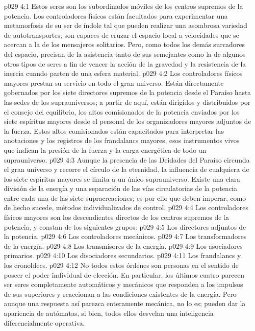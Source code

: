 \vs p029 4:1 Estos seres son los subordinados móviles de los centros supremos de la potencia. Los controladores físicos están facultados para experimentar una metamorfosis de su ser de índole tal que pueden realizar una asombrosa variedad de autotransportes; son capaces de cruzar el espacio local a velocidades que se acercan a la de los mensajeros solitarios. Pero, como todos los demás surcadores del espacio, precisan de la asistencia tanto de sus semejantes como la de algunos otros tipos de seres a fin de vencer la acción de la gravedad y la resistencia de la inercia cuando parten de una esfera material.
\vs p029 4:2 Los controladores físicos mayores prestan su servicio en todo el gran universo. Están directamente gobernados por los siete directores supremos de la potencia desde el Paraíso hasta las sedes de los suprauniversos; a partir de aquí, están dirigidos y distribuidos por el consejo del equilibrio, los altos comisionados de la potencia enviados por los siete espíritus mayores desde el personal de los organizadores mayores adjuntos de la fuerza. Estos altos comisionados están capacitados para interpretar las anotaciones y los registros de los frandalancs mayores, esos instrumentos vivos que indican la presión de la fuerza y la carga energética de todo un suprauniverso.
\vs p029 4:3 Aunque la presencia de las Deidades del Paraíso circunda el gran universo y recorre el círculo de la eternidad, la influencia de cualquiera de los siete espíritus mayores se limita a un único suprauniverso. Existe una clara división de la energía y una separación de las vías circulatorias de la potencia entre cada una de las siete supracreaciones; es por ello que deben imperar, como de hecho sucede, métodos individualizados de control.
\vs p029 4:4 \pc Los controladores físicos mayores son los descendientes directos de los centros supremos de la potencia, y constan de los siguientes grupos:
\vs p029 4:5 Los directores adjuntos de la potencia.
\vs p029 4:6 Los controladores mecánicos.
\vs p029 4:7 Los transformadores de la energía.
\vs p029 4:8 Los transmisores de la energía.
\vs p029 4:9 Los asociadores primarios.
\vs p029 4:10 Los disociadores secundarios.
\vs p029 4:11 Los frandalancs y los cronoldecs.
\vs p029 4:12 \pc No todos estos órdenes son personas en el sentido de poseer el poder individual de elección. En particular, los últimos cuatro parecen ser seres completamente automáticos y mecánicos que responden a los impulsos de sus superiores y reaccionan a las condiciones existentes de la energía. Pero aunque una respuesta así parezca enteramente mecánica, no lo es; pueden dar la apariencia de autómatas, si bien, todos ellos desvelan una inteligencia diferencialmente operativa.
